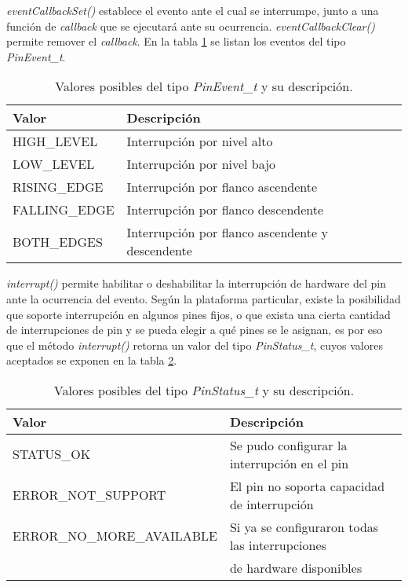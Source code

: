 \emph{eventCallbackSet()} establece el evento ante el cual se interrumpe, junto a una función de \emph{callback} que se ejecutará ante su ocurrencia. \emph{eventCallbackClear()} permite remover el \emph{callback}. En la tabla \ref{tab:PinEvtT} se listan los eventos del tipo \emph{PinEvent\_t}.

\begin{table}[h]
	\centering	
	\begin{tabular}{l l}   
		\toprule
		\textbf{Valor} & \textbf{Descripción} \\
		\midrule
		HIGH\_LEVEL  & Interrupción por nivel alto \\		
		LOW\_LEVEL   & Interrupción por nivel bajo \\
		RISING\_EDGE & Interrupción por flanco ascendente \\
		FALLING\_EDGE & Interrupción por flanco descendente \\
		BOTH\_EDGES & Interrupción por flanco ascendente y descendente \\
		\bottomrule
		\hline
	\end{tabular}
	\caption[Valores posibles del tipo \emph{PinEvent\_t}.]{Valores posibles del tipo \emph{PinEvent\_t} y su descripción.}
	\label{tab:PinEvtT}
\end{table}

\emph{interrupt()} permite habilitar o deshabilitar la interrupción de hardware del pin ante la ocurrencia del evento. Según la plataforma particular, existe la posibilidad que soporte interrupción en algunos pines fijos, o que exista una cierta cantidad de interrupciones de pin y se pueda elegir a qué pines se le asignan, es por eso que el método \emph{interrupt()} retorna un valor del tipo \emph{PinStatus\_t}, cuyos valores aceptados se exponen en la tabla \ref{tab:PinStatusT}. 

\begin{table}[h]
	\centering	
	\begin{tabular}{l l}   
		\toprule
		\textbf{Valor} & \textbf{Descripción} \\
		\midrule
		STATUS\_OK & Se pudo configurar la interrupción en el pin \\		
		ERROR\_NOT\_SUPPORT & El pin no soporta capacidad de interrupción \\
		ERROR\_NO\_MORE\_AVAILABLE & Si ya se configuraron todas las interrupciones\\
		 & de hardware disponibles \\
		\bottomrule
		\hline
	\end{tabular}
	\caption[Valores posibles del tipo \emph{PinStatus\_t}.]{Valores posibles del tipo \emph{PinStatus\_t} y su descripción.}
	\label{tab:PinStatusT}
\end{table}

